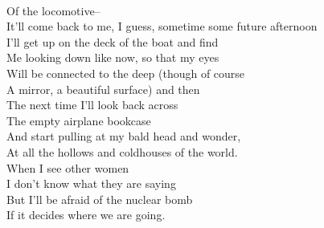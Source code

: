 \documentclass[smalldemyvopaper,11pt,twoside,onecolumn,openright,extrafontsizes]{memoir}
\begin{document}
\\Of the locomotive--
\\It'll come back to me, I guess, sometime some future afternoon
\\I'll get up on the deck of the boat and find
\\Me looking down like now, so that my eyes
\\Will be connected to the deep (though of course
\\A mirror, a beautiful surface) and then
\\The next time I'll look back across
\\The empty airplane bookcase
\\And start pulling at my bald head and wonder,
\\At all the hollows and coldhouses of the world.
\\When I see other women
\\I don't know what they are saying
\\But I'll be afraid of the nuclear bomb
\\If it decides where we are going.
\end{document}
